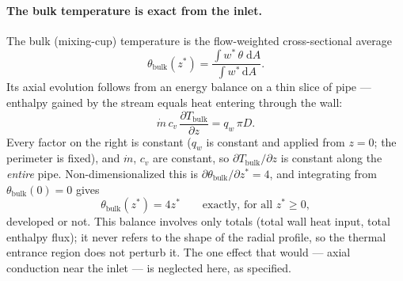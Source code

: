 \documentclass[12pt,a4paper]{article}
\newcommand{\parder}[2]{\frac{\partial #1}{\partial #2}}
\begin{document}
\paragraph{The bulk temperature is exact from the inlet.}
The bulk (mixing-cup) temperature is the flow-weighted cross-sectional average
\begin{equation}
    \theta_{\text{bulk}}(z^*) =
        \frac{\displaystyle\int w^*\,\theta \; \mathrm{d}A}{\displaystyle\int w^* \, \mathrm{d}A}.
\end{equation}
Its axial evolution follows from an energy balance on a thin slice of pipe --- enthalpy gained
by the stream equals heat entering through the wall:
\begin{equation}
    \dot{m}\,c_v\,\parder{T_{\text{bulk}}}{z} = q_w\,\pi D .
\end{equation}
Every factor on the right is constant ($q_w$ is constant and applied from $z=0$; the perimeter
is fixed), and $\dot m$, $c_v$ are constant, so $\partial T_{\text{bulk}}/\partial z$ is constant
along the \emph{entire} pipe. Non-dimensionalized this is $\partial\theta_{\text{bulk}}/\partial
z^* = 4$, and integrating from $\theta_{\text{bulk}}(0)=0$ gives
\begin{equation}
    \theta_{\text{bulk}}(z^*) = 4z^* \qquad\text{exactly, for all } z^*\ge 0 ,
\end{equation}
developed or not. This balance involves only totals (total wall heat input, total enthalpy
flux); it never refers to the shape of the radial profile, so the thermal entrance region does
not perturb it. The one effect that would --- axial conduction near the inlet --- is neglected
here, as specified.
\end{document}
